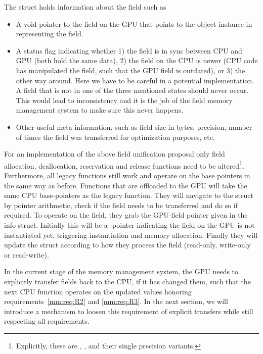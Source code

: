 The  struct holds information about the field such as
\begin{itemize}
	\item A void-pointer to the field on the GPU that points to the object instance in \quda representing the field.
	\item A status flag indicating whether 1) the field is in sync between CPU and GPU (both hold the same data), 2) the field on the CPU is newer (CPU code has manipulated the field, such that the GPU field is outdated), or 3) the other way around. Here we have to be careful in a potential implementation. A field that is not in one of the three mentioned states should never occur. This would lead to inconsistency and it is the job of the field memory management system to make sure this never happens.
	\item Other useful meta information, such as field size in bytes, precision, number of times the field was transferred for optimization purposes, etc.
\end{itemize}
For an implementation of the above field unification proposal only field allocation, deallocation, reservation and release functions need to be altered\footnote{Explicitly, these are , ,  and their single precision variants.}.
Furthermore, all legacy \openqxd functions still work and operate on the base pointers in the same way as before.
Functions that are offloaded to the GPU will take the same CPU base-pointers as the legacy function.
They will navigate to the  struct by pointer arithmetic, check if the field needs to be transferred and do so if required.
To operate on the field, they grab the GPU-field pointer given in the info struct.
Initially this will be a \NULL-pointer indicating the field on the GPU is not instantiated yet, triggering instantiation and memory allocation.
Finally they will update the  struct according to how they process the field (read-only, write-only or read-write).

In the current stage of the memory management system, the GPU needs to explicitly transfer fields back to the CPU, if it has changed them, such that the next CPU function operates on the updated values honoring requirements~\ref{mm:req:R2} and \ref{mm:req:R3}.
In the next section, we will introduce a mechanism to loosen this requirement of explicit transfers while still respecting all requirements.

